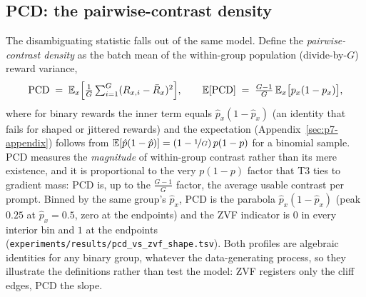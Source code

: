 \subsection{PCD: the pairwise-contrast density}
\label{sec:p7-pcd}
The disambiguating statistic falls out of the same model. Define the
\emph{pairwise-contrast density} as the batch mean of the within-group
population (divide-by-$G$) reward variance,
\begin{equation}
  \mathrm{PCD} \;=\; \mathbb{E}_x\Bigl[\tfrac1G\textstyle\sum_{i=1}^{G}(R_{x,i}-\bar R_x)^2\Bigr],
  \qquad
  \mathbb{E}[\mathrm{PCD}] \;=\; \frac{G-1}{G}\,\mathbb{E}_x\bigl[p_x(1-p_x)\bigr],
  \label{eq:p7-pcd}
\end{equation}
where for binary rewards the inner term equals $\hat p_x(1-\hat p_x)$ (an
identity that fails for shaped or jittered rewards) and the expectation
(Appendix~\ref{sec:p7-appendix}) follows from
$\mathbb{E}[\hat p(1-\hat p)] = (1 - \nicefrac{1}{G})\,p(1-p)$ for a binomial
sample. PCD measures the \emph{magnitude} of within-group contrast rather
than its mere existence, and it is proportional to the very $p(1-p)$ factor
that T3 ties to gradient mass: PCD is, up to the $\frac{G-1}{G}$ factor, the
average usable contrast per prompt. Binned by the same group's $\hat p_x$, PCD is the parabola
$\hat p_x(1-\hat p_x)$ (peak $0.25$ at $\hat p_x = 0.5$, zero at the
endpoints) and the ZVF indicator is $0$ in every interior bin and $1$ at the
endpoints (\texttt{experiments/results/pcd\_vs\_zvf\_shape.tsv}). Both
profiles are algebraic identities for any binary group, whatever the
data-generating process, so they illustrate the definitions rather than test
the model: ZVF registers only the cliff edges, PCD the slope.


